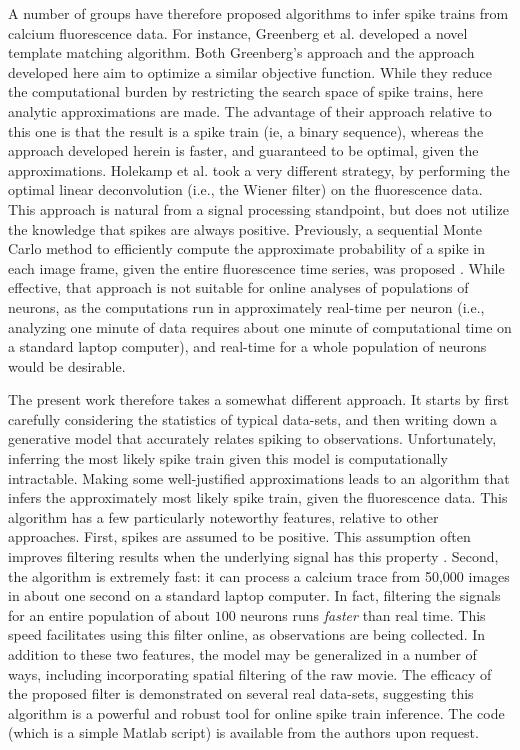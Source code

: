 A number of groups have therefore proposed algorithms to infer spike trains from calcium fluorescence data.  For instance, Greenberg et al. \cite{GreenbergKerr08} developed a novel template matching algorithm. %
Both Greenberg's approach and the approach developed here aim to optimize a similar objective function.  While they reduce the computational burden by restricting the search space of spike trains, here analytic approximations are made.  The advantage of their approach relative to this one is that the result is a spike train (ie, a binary sequence), whereas the approach developed herein is faster, and guaranteed to be optimal, given the approximations.  Holekamp et al. \cite{HolekampHoly08} took a very different strategy, by performing the optimal linear deconvolution (i.e., the Wiener filter) on the fluorescence data.  This approach is natural from a signal processing standpoint, but does not utilize the knowledge that spikes are always positive.  Previously, a sequential Monte Carlo method to efficiently compute the approximate probability of a spike in each image frame, given the entire fluorescence time series, was proposed \cite{VogelsteinPaninski09}.  While effective, that approach is not suitable for online analyses of populations of neurons, as the computations run in approximately real-time per neuron (i.e., analyzing one minute of data requires about one minute of computational time on a standard laptop computer), and real-time for a whole population of neurons would be desirable.


The present work therefore takes a somewhat different approach.  It starts by first carefully considering the statistics of typical data-sets, and then writing down a generative model that accurately relates spiking to observations. Unfortunately, inferring the most likely spike train given this model is computationally intractable.  Making some well-justified approximations leads to an algorithm that infers the approximately most likely spike train, given the fluorescence data.  This algorithm has a few particularly noteworthy features, relative to other approaches.  First, spikes are assumed to be positive.  This assumption often improves filtering results when the underlying signal has this property \cite{LeeSeung99, HuysPaninski06}.  Second, the algorithm is extremely fast: it can process a calcium trace from 50,000 images in about one second on a standard laptop computer. In fact, filtering the signals for an entire population of about $100$ neurons runs \emph{faster} than real time. This speed facilitates using this filter online, as observations are being collected. In addition to these two features, the model may be generalized in a number of ways, including incorporating spatial filtering of the raw movie. The efficacy of the proposed filter is demonstrated on several real data-sets, suggesting this algorithm is a powerful and robust tool for online spike train inference.  The code (which is a simple Matlab script) is available from the authors upon request. 